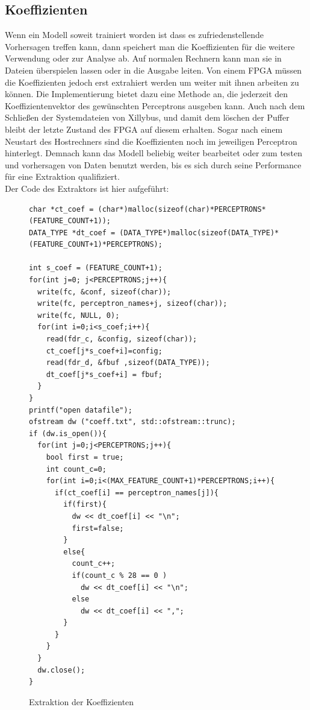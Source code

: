 \subsection{Koeffizienten}
Wenn ein Modell soweit trainiert worden ist dass es zufriedenstellende Vorhersagen treffen kann, dann speichert man die Koeffizienten für die weitere Verwendung oder zur Analyse ab. Auf normalen Rechnern kann man sie in Dateien überspielen lassen oder in die Ausgabe leiten. Von einem FPGA
müssen die Koeffizienten jedoch erst extrahiert werden um weiter mit ihnen arbeiten zu können. Die Implementierung bietet dazu eine Methode an, die jederzeit den Koeffizientenvektor des gewünschten Perceptrons ausgeben kann. Auch nach dem Schließen der Systemdateien von Xillybus, und damit dem löschen der Puffer bleibt der letzte Zustand des FPGA auf diesem erhalten. Sogar nach einem Neustart des Hostrechners sind die Koeffizienten noch im jeweiligen Perceptron hinterlegt. Demnach kann das Modell beliebig weiter bearbeitet oder zum testen und vorhersagen von Daten benutzt werden, bis es sich durch seine Performance für eine Extraktion qualifiziert.\\
Der Code des Extraktors ist hier aufgeführt: 

\begin{figure}[ht]
\centering
\begin{lstlisting}
char *ct_coef = (char*)malloc(sizeof(char)*PERCEPTRONS*(FEATURE_COUNT+1));
DATA_TYPE *dt_coef = (DATA_TYPE*)malloc(sizeof(DATA_TYPE)*(FEATURE_COUNT+1)*PERCEPTRONS);

int s_coef = (FEATURE_COUNT+1);
for(int j=0; j<PERCEPTRONS;j++){
  write(fc, &conf, sizeof(char));
  write(fc, perceptron_names+j, sizeof(char));
  write(fc, NULL, 0);
  for(int i=0;i<s_coef;i++){
    read(fdr_c, &config, sizeof(char));
    ct_coef[j*s_coef+i]=config;
    read(fdr_d, &fbuf ,sizeof(DATA_TYPE));
    dt_coef[j*s_coef+i] = fbuf;
  }
}
printf("open datafile");
ofstream dw ("coeff.txt", std::ofstream::trunc);
if (dw.is_open()){
  for(int j=0;j<PERCEPTRONS;j++){
    bool first = true;
    int count_c=0;
    for(int i=0;i<(MAX_FEATURE_COUNT+1)*PERCEPTRONS;i++){
      if(ct_coef[i] == perceptron_names[j]){
        if(first){
          dw << dt_coef[i] << "\n";
          first=false;
        }
        else{
          count_c++;
          if(count_c % 28 == 0 )
            dw << dt_coef[i] << "\n";
          else
            dw << dt_coef[i] << ",";
        }
      }
    }
  }
  dw.close();
}
\end{lstlisting}
\caption{Extraktion der Koeffizienten}
\end{figure}
